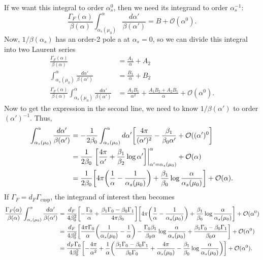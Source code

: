 \documentclass[11pt,twoside,reqno]{amsart}
\theoremstyle{plain}
\theoremstyle{remark}
\theoremstyle{definition}
\theoremstyle{remark}
\theoremstyle{definition}
\theoremstyle{definition}
\newcommand{\cO}{\mathcal{O}}
\newcommand{\cusp}{\mathrm{cusp}}
\begin{document}
	If we want this integral to order $\alpha_s^0$, then we need its integrand to order $\alpha_s^{-1}$:
	\begin{equation}
		\frac{\Gamma_F(\alpha)}{\beta(\alpha)}\int_{\alpha_s(\mu_0)}^\alpha \frac{d\alpha'}{\beta(\alpha')} = B + \cO(\alpha^0).
	\end{equation}
	Now, $1/\beta(\alpha_s)$ has an order-2 pole a at $\alpha_s = 0$, so we can divide this integral into two Laurent series
	\begin{equation}
	\begin{aligned}
		\frac{\Gamma_F(\alpha)}{\beta(\alpha)} &= \frac{A_1}{\alpha} + A_2 \\
		\int_{\alpha_s(\mu_0)}^\alpha \frac{d\alpha'}{\beta(\alpha')} &= \frac{B_1}{\alpha} + B_2 \\
		\frac{\Gamma_F(\alpha)}{\beta(\alpha)}\int_{\alpha_s(\mu_0)}^\alpha \frac{d\alpha'}{\beta(\alpha')} &= \frac{A_1B_1}{\alpha^2} + \frac{A_1 B_2 + A_2 B_1}{\alpha} + \cO(\alpha^0).
	\end{aligned}
	\end{equation}
	Now to get the expression in the second line, we need to know $1/\beta(\alpha')$ to order $(\alpha')^{-1}$. Thus,
	\begin{equation}
	\begin{aligned}
		\int_{\alpha_s(\mu_0)}^\alpha \frac{d\alpha'}{\beta(\alpha')} &= -\frac{1}{2\beta_0}\int_{\alpha_s(\mu_0)}^\alpha d\alpha' \qty[\frac{4\pi}{(\alpha')^2} - \frac{\beta_1}{\beta_0 \alpha'} + \cO((\alpha')^0] \\
		&= \frac{1}{2\beta_0}\eval{\qty[\frac{4\pi}{\alpha'} + \frac{\beta_1}{\beta_2}\log\alpha']}_{\alpha' = \alpha_s(\mu_0)}^\alpha + \cO(\alpha) \\
		&= \frac{1}{2\beta_0}\qty[4\pi\qty(\frac{1}{\alpha} - \frac{1}{\alpha_s(\mu_0)}) + \frac{\beta_1}{\beta_0}\log\frac{\alpha}{\alpha_s(\mu_0)}] + \cO(\alpha).
	\end{aligned}
	\end{equation}
	If $\Gamma_F = d_F \Gamma_\cusp$, the integrand of interest then becomes
	\begin{equation}
	\begin{aligned}
		\frac{\Gamma_F(\alpha)}{\beta(\alpha)}\int_{\alpha_s(\mu_0)}^\alpha \frac{d\alpha'}{\beta(\alpha')} &= \frac{d_F}{4\beta_0^2}\qty[-\frac{\Gamma_0}{\alpha} + \frac{\beta_1 \Gamma_0 - \beta_0 \Gamma_1}{4\pi\beta_0}]\qty[4\pi\qty(\frac{1}{\alpha} - \frac{1}{\alpha_s(\mu_0)}) + \frac{\beta_1}{\beta_0}\log\frac{\alpha}{\alpha_s(\mu_0)}] + \cO(\alpha^0) \\
		&= \frac{d_F}{4\beta_0^2}\qty[\frac{4\pi \Gamma_0}{\alpha}\qty(\frac{1}{\alpha_s(\mu_0)} - \frac{1}{\alpha}) - \frac{\Gamma_0 \beta_1}{\beta_0 \alpha}\log\frac{\alpha}{\alpha_s(\mu_0)} + \frac{\beta_1 \Gamma_0 - \beta_0 \Gamma_1}{\beta_0 \alpha}] + \cO(\alpha^0) \\
		&= \frac{d_F\Gamma_0}{4\beta_0^2}\qty[-\frac{4\pi}{\alpha^2} + \frac{1}{\alpha}\qty(\frac{\beta_1\Gamma_0 - \beta_0 \Gamma_1}{\beta_0\Gamma_0} + \frac{4\pi}{\alpha_s(\mu_0)} - \frac{\beta_1}{\beta_0}\log\frac{\alpha}{\alpha_s(\mu_0)})] + \cO(\alpha^0).
	\end{aligned}
	\end{equation}
\end{document}
